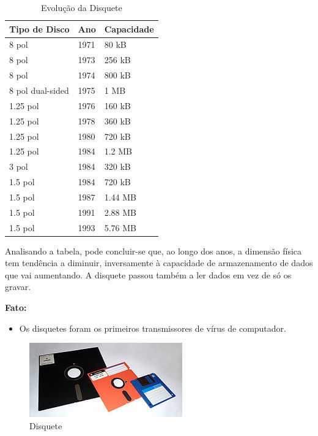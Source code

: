 \documentclass{report}
\begin{document}
		
	\begin{table}[h]
		\centering
		\caption{Evolução da Disquete}
		\label{my-label}
		\begin{tabular}{|l|l|l|}
		\hline
		\textbf{Tipo de Disco} & \textbf{Ano} & \textbf{Capacidade} \\ \hline
		8 pol            & 1971 & 80 kB   \\ \hline
		8 pol            & 1973 & 256 kB  \\ \hline
		8 pol            & 1974 & 800 kB  \\ \hline
		8 pol dual-sided & 1975 & 1 MB    \\ \hline
		1.25 pol         & 1976 & 160 kB  \\ \hline
		1.25 pol         & 1978 & 360 kB  \\ \hline
		1.25 pol         & 1980 & 720 kB  \\ \hline
		1.25 pol         & 1984 & 1.2 MB  \\ \hline
		3 pol            & 1984 & 320 kB  \\ \hline
		1.5 pol          & 1984 & 720 kB  \\ \hline
		1.5 pol          & 1987 & 1.44 MB \\ \hline
		1.5 pol          & 1991 & 2.88 MB \\ \hline
		1.5 pol          & 1993 & 5.76 MB \\ \hline
		
		\end{tabular}
		\end{table}		
 
	Analisando a tabela, pode concluir-se que, ao longo dos anos, a dimensão física tem tendência a diminuir, inversamente à capacidade de armazenamento de dados que vai aumentando. A disquete passou também a ler dados em vez de só os gravar. 
	 
\newpage

	\textbf{Fato:}	
		\begin{itemize}
		 	\item Os disquetes foram os primeiros transmissores de vírus de computador. 
	 	\end{itemize}
	
	
	\begin{figure} [h]
		\centering
		\includegraphics[scale=1]{disquete.jpg}
		\caption{Disquete}
	\end{figure}
	
\end{document}
